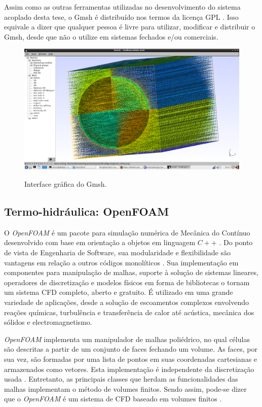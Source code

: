 Assim como as outras ferramentas utilizadas no desenvolvimento do sistema acoplado desta tese,
o Gmsh é distribuído nos termos da licença GPL \cite{gplv3}. Isso equivale a dizer que
qualquer pessoa é livre para utilizar, modificar e distribuir o Gmsh, desde que não o utilize
em sistemas fechados e/ou comerciais.

\begin{figure}[htb]
  \caption{Interface gráfica do Gmsh. }
  \centering\includegraphics[scale=0.45]{figuras/gmsh_celula.png}
  \label{fig:gui-gmsh}
\end{figure}


\subsection{Termo-hidráulica: \textbf{OpenFOAM}}
\label{subsection:openfoam}

O \textit{OpenFOAM} é um pacote para simulação numérica de Mecânica
do Contínuo desenvolvido com base em orientação a objetos em linguagem $C++$ .
Do ponto de vista de Engenharia de Software, sua modularidade e flexibilidade são vantagens
em relação a outros códigos monolíticos  \cite{Jasak2007}. Sua implementação em componentes para manipulação de malhas, suporte
à solução de sistemas lineares, operadores de discretização e modelos físicos em forma de bibliotecas o tornam
um sistema CFD completo, aberto e gratuito. É utilizado em uma grande variedade
de aplicações, desde a solução de escoamentos complexos envolvendo reações químicas, turbulência e
transferência de calor até acústica, mecânica dos sólidos e electromagnetismo. 

\textit{OpenFOAM} implementa um manipulador de malhas poliédrico, no qual células são descritas a partir
de um conjunto de faces fechando um volume. As faces, por sua vez, são formadas por uma lista de pontos
em suas coordenadas cartesianas e armazenados como vetores. Esta implementação é independente da discretização
usada \cite{Jasak2009}. Entretanto, as principais classes que herdam as funcionalidades das malhas implementam o método de
volumes finitos. Sendo assim, pode-se dizer que o \textit{OpenFOAM} é um sistema de CFD baseado em volumes
finitos \cite{Maric2014}.

